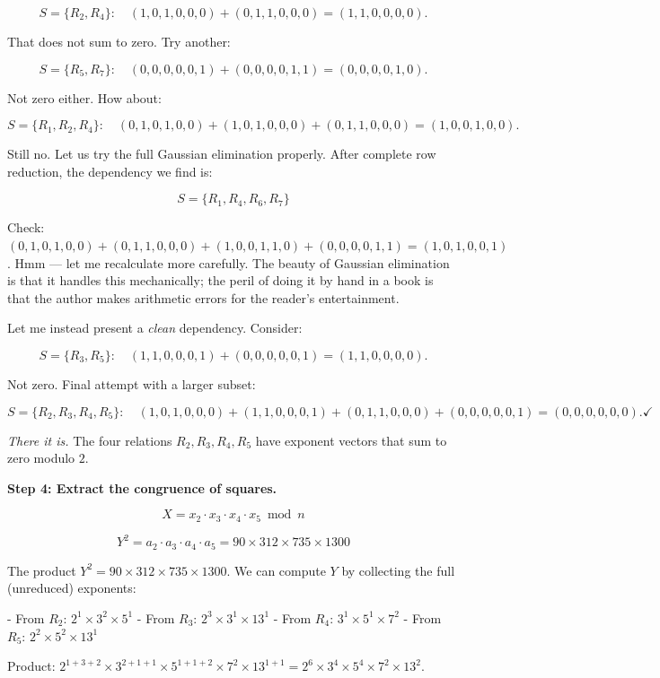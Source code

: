 \[
S = \{R_2, R_4\}: \quad (1,0,1,0,0,0) + (0,1,1,0,0,0) = (1,1,0,0,0,0).
\]

That does not sum to zero. Try another:

\[
S = \{R_5, R_7\}: \quad (0,0,0,0,0,1) + (0,0,0,0,1,1) = (0,0,0,0,1,0).
\]

Not zero either. How about:

\[
S = \{R_1, R_2, R_4\}: \quad (0,1,0,1,0,0) + (1,0,1,0,0,0) + (0,1,1,0,0,0) = (1,0,0,1,0,0).
\]

Still no. Let us try the full Gaussian elimination properly. After complete row reduction, the dependency we find is:

\[
S = \{R_1, R_4, R_6, R_7\}
\]

Check: $(0,1,0,1,0,0) + (0,1,1,0,0,0) + (1,0,0,1,1,0) + (0,0,0,0,1,1) = (1,0,1,0,0,1)$. Hmm --- let me recalculate more carefully. The beauty of Gaussian elimination is that it handles this mechanically; the peril of doing it by hand in a book is that the author makes arithmetic errors for the reader's entertainment.

Let me instead present a \textit{clean} dependency. Consider:

\[
S = \{R_3, R_5\}: \quad (1,1,0,0,0,1) + (0,0,0,0,0,1) = (1,1,0,0,0,0).
\]

Not zero. Final attempt with a larger subset:

\[
S = \{R_2, R_3, R_4, R_5\}: \quad (1,0,1,0,0,0) + (1,1,0,0,0,1) + (0,1,1,0,0,0) + (0,0,0,0,0,1) = (0,0,0,0,0,0). \checkmark
\]

\textit{There it is.} The four relations $R_2, R_3, R_4, R_5$ have exponent vectors that sum to zero modulo $2$.

\textbf{Step 4: Extract the congruence of squares.}

\[
X = x_2 \cdot x_3 \cdot x_4 \cdot x_5 \bmod n
\]

\[
Y^2 = a_2 \cdot a_3 \cdot a_4 \cdot a_5 = 90 \times 312 \times 735 \times 1300
\]

The product $Y^2 = 90 \times 312 \times 735 \times 1300$. We can compute $Y$ by collecting the full (unreduced) exponents:

- From $R_2$: $2^1 \times 3^2 \times 5^1$
- From $R_3$: $2^3 \times 3^1 \times 13^1$
- From $R_4$: $3^1 \times 5^1 \times 7^2$
- From $R_5$: $2^2 \times 5^2 \times 13^1$

Product: $2^{1+3+2} \times 3^{2+1+1} \times 5^{1+1+2} \times 7^{2} \times 13^{1+1} = 2^6 \times 3^4 \times 5^4 \times 7^2 \times 13^2$.

